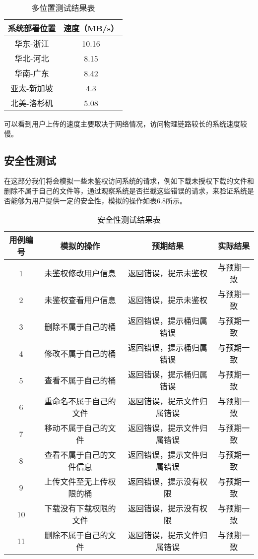 \begin{table}[h]
    \centering
    \caption{多位置测试结果表}
    \begin{tabular}{cc}
      \toprule
      系统部署位置   & 速度（MB/s）   \\
      \midrule
      华东-浙江     & 10.16  \\
      华北-河北     & 8.15   \\
      华南-广东     & 8.42  \\
      亚太-新加坡   & 4.3   \\
      北美-洛杉矶   & 5.08  \\
      \bottomrule
    \end{tabular}
\end{table}

可以看到用户上传的速度主要取决于网络情况，访问物理链路较长的系统速度较慢。

\subsection{安全性测试}%

在这部分我们将会模拟一些未鉴权访问系统的请求，例如下载未授权下载的文件和删除不属于自己的文件等，通过观察系统是否拦截这些错误的请求，来验证系统是否能够为用户提供一定的安全性，模拟的操作如表6.8所示。

\begin{table}[h]
  \centering
  \caption{安全性测试结果表}
  \begin{tabular}{cccc}
    \toprule
    用例编号 & 模拟的操作   & 预期结果 & 实际结果  \\
    \midrule
    1  & 未鉴权修改用户信息       & 返回错误，提示未鉴权       & 与预期一致\\
    2  & 未鉴权查看用户信息       & 返回错误，提示未鉴权       & 与预期一致\\
    3  & 删除不属于自己的桶       & 返回错误，提示桶归属错误    & 与预期一致 \\
    4  & 修改不属于自己的桶       & 返回错误，提示桶归属错误    & 与预期一致\\
    5  & 查看不属于自己的桶       & 返回错误，提示桶归属错误    & 与预期一致 \\
    6  & 重命名不属于自己的文件    & 返回错误，提示文件归属错误  & 与预期一致\\
    7  & 移动不属于自己的文件      & 返回错误，提示文件归属错误  & 与预期一致\\
    8  & 查看不属于自己的文件信息   & 返回错误，提示文件归属错误  & 与预期一致   \\
    9  & 上传文件至无上传权限的桶   & 返回错误，提示没有权限      & 与预期一致\\
    10 & 下载没有下载权限的文件     & 返回错误，提示没有权限      & 与预期一致\\
    11 & 删除不属于自己的文件       & 返回错误，提示文件归属错误   & 与预期一致 \\
    \bottomrule
  \end{tabular}
\end{table}

